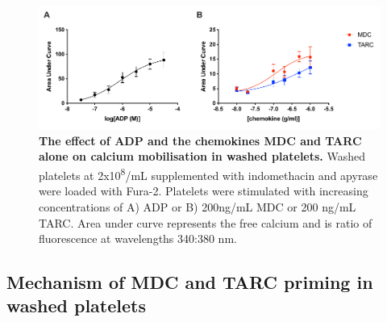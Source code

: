 \documentclass[11pt,twoside]{bristolthesis}
\begin{document}
\begin{figure}
\includegraphics[width=0.9\linewidth]{figure/Chemokines/Layouts/MDC_TARC_calcium_wp} \caption[The effect of ADP and the chemokines MDC and TARC alone on calcium mobilisation in washed platelets.]{\textbf{The effect of ADP and the chemokines MDC and TARC alone on calcium mobilisation in washed platelets.} Washed platelets at 2x10\textsuperscript{8}/mL supplemented with indomethacin and apyrase were loaded with Fura-2. Platelets were stimulated with increasing concentrations of A) ADP or B) 200ng/mL MDC or 200 ng/mL TARC. Area under curve represents the free calcium and is ratio of fluorescence at wavelengths 340:380 nm.}\label{fig:MDC-TARC-wp-calcium}
\end{figure}
\hypertarget{mechanism-of-mdc-and-tarc-priming-in-washed-platelets}{%
\subsection{Mechanism of MDC and TARC priming in washed platelets}\label{mechanism-of-mdc-and-tarc-priming-in-washed-platelets}}
\end{document}
